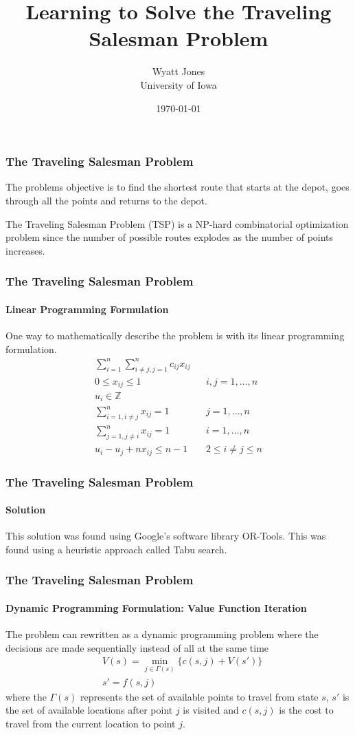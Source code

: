 \documentclass{beamer}
\title{Learning to Solve the Traveling Salesman Problem}
\author{Wyatt Jones\\University of Iowa}
\date{\today}
\begin{document}
\frame{\titlepage}

\begin{frame}
  \frametitle{The Traveling Salesman Problem}
  The problems objective is to find the shortest route that starts at the depot, goes through all the points and returns to the depot.

  \begin{figure}[H]
    \centering
  \end{figure}

  The Traveling Salesman Problem (TSP) is a NP-hard combinatorial optimization problem since the number of possible routes explodes as the number of points increases.
\end{frame}


\begin{frame}
  \frametitle{The Traveling Salesman Problem}
  \framesubtitle{Linear Programming Formulation}
  One way to mathematically describe the problem is with its linear programming formulation.
    \begin{align*}
    \sum_{i=1}^n{\sum_{i \neq j, j=1}^n {c_{ij} x_{ij}}}&&\\
    0 \leq x_{ij} \leq 1 && i, j = 1, \dots, n \\
    u_i \in \mathbb{Z} && \\
    \sum_{i=1, i \neq j}^n{x_{ij}} = 1 && j = 1, \dots, n\\
    \sum_{j=1, j \neq i}^n{x_{ij}} = 1 && i = 1, \dots, n\\
    u_i-u_j+nx_{ij}\leq n-1 && 2 \leq i \neq j \leq n
  \end{align*}
\end{frame}


\begin{frame}
  \frametitle{The Traveling Salesman Problem}
  \framesubtitle{Solution}
  This solution was found using Google's software library OR-Tools. This was found using a heuristic approach called Tabu search.
  \begin{figure}[H]
    \centering
  \end{figure}
\end{frame}


\begin{frame}
  \frametitle{The Traveling Salesman Problem}
  \framesubtitle{Dynamic Programming Formulation: Value Function Iteration}
  The problem can rewritten as a dynamic programming problem where the decisions are made sequentially instead of all at the same time
  \begin{align*}
    &V(s) = \min_{j \in \Gamma(s)}{\{c(s, j) + V(s')\}}\\
    &s'=f(s, j)
  \end{align*}
  where the $\Gamma(s)$ represents the set of available points to travel from state $s$, $s'$ is the set of available locations after point $j$ is visited and $c(s, j)$ is the cost to travel from the current location to point $j$.
\end{frame}
\end{document}
